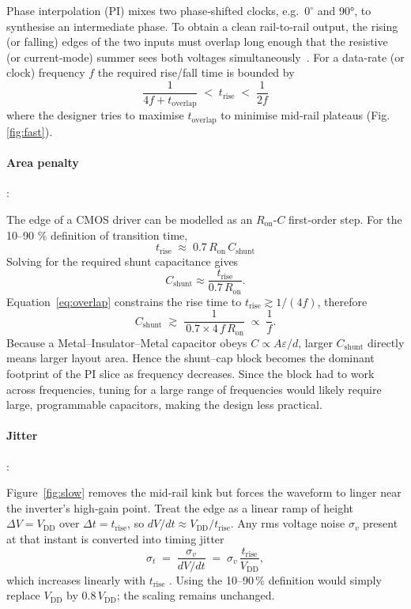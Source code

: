 Phase interpolation (PI) mixes two phase‑shifted clocks, e.g.\ $0^{\circ}$ and
\ang{90}, to synthesise an intermediate phase.  To obtain a clean
rail‑to‑rail output, the rising (or falling) edges of the two inputs must
overlap long enough that the resistive (or current‑mode) summer sees
both voltages simultaneously \cite{Razavi2023PI}.  For a data‑rate (or clock)
frequency $f$ the required rise/fall time is bounded by
%
\begin{equation}
{\;
     \frac{1}{4f+t_{\text{overlap}}} 
     \;<\; t_{\text{rise}} 
     \;<\; \frac{1}{2f}
     \;}
\label{eq:overlap}
\end{equation}
%
where the designer tries to maximise $t_{\text{overlap}}$ to minimise
mid‑rail plateaus (Fig.\,\ref{fig:fast}).

\paragraph{Area penalty}:

The edge of a CMOS driver can be modelled as an \(R_{\text{on}}\)-\(C\) first‑order step.  
For the 10--90 \% definition of transition time,
\[
  t_{\text{rise}}\;\approx\;0.7\,R_{\text{on}}\,C_{\text{shunt}}
\]
Solving for the required shunt capacitance gives  
\[
  C_{\text{shunt}} \approx \frac{t_{\text{rise}}}{0.7\,R_{\text{on}}}.
  \label{eq:C_shunt_area}
\]
Equation~\eqref{eq:overlap} constrains the rise time to
\(t_{\text{rise}}\gtrsim 1/(4f)\), therefore  
\[
  C_{\text{shunt}}
  \;\gtrsim\; 
  \frac{1}{\,0.7 \times 4\,f\,R_{\text{on}}}
  \;\propto\;\frac{1}{f}.
  \label{eq:C_shunt}
\]
Because a Metal–Insulator–Metal capacitor obeys \(C\propto A\varepsilon/d\),
larger \(C_{\text{shunt}}\) directly means larger layout area.  
Hence the shunt–cap block becomes the dominant footprint of the PI slice as frequency decreases. 
Since the block had to work across frequencies, tuning for a large range of frequencies would likely require large, programmable capacitors, making the design less practical.

\paragraph{Jitter}:

Figure~\ref{fig:slow} removes the mid‑rail kink but forces the waveform to
linger near the inverter’s high‑gain point.  Treat the edge as a linear ramp
of height \(\Delta V = V_{\text{DD}}\) over
\(\Delta t = t_{\text{rise}}\), so
\(dV/dt \approx V_{\text{DD}}/t_{\text{rise}}\).
Any rms voltage noise \(\sigma_v\) present at that instant is converted into
timing jitter
\[
  \sigma_t
  \;=\;
  \frac{\sigma_v}{dV/dt}
  \;=\;
  \sigma_v \,\frac{t_{\text{rise}}}{V_{\text{DD}}},
\]
which increases linearly with \(t_{\text{rise}}\)
\cite{TektronixJitterPrimer2012}.  Using the 10--90\,\% definition would simply
replace \(V_{\text{DD}}\) by \(0.8\,V_{\text{DD}}\); the scaling remains
unchanged.


